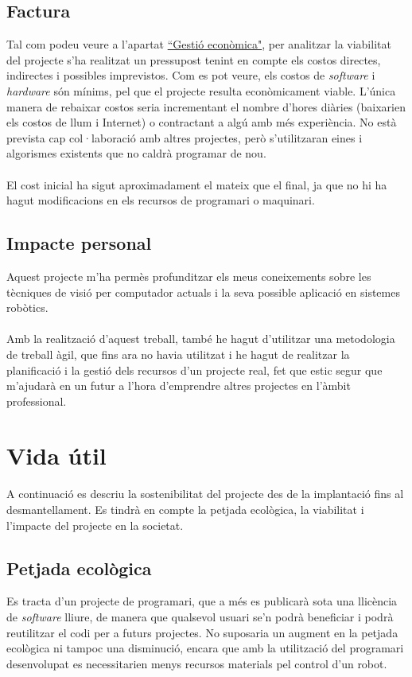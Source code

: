 	\subsection{Factura}
		Tal com podeu veure a l'apartat \hyperref[sec:Costos]{``Gestió econòmica"}, per analitzar la viabilitat del projecte s'ha realitzat un pressupost tenint en compte els costos directes, indirectes
		i possibles imprevistos. Com es pot veure, els costos de \textit{software} i \textit{hardware} són mínims, pel que el projecte resulta econòmicament viable.
		L'única manera de rebaixar costos seria incrementant el nombre d'hores diàries (baixarien els costos de llum i Internet) o contractant a algú amb més experiència.
		No està prevista cap col·laboració amb altres projectes, però s'utilitzaran eines i algorismes existents que no caldrà programar de nou.\\\\
		El cost inicial ha sigut aproximadament el mateix que el final, ja que no hi ha hagut modificacions en els recursos de programari o maquinari.

	\subsection{Impacte personal}
		Aquest projecte m'ha permès profunditzar els meus coneixements sobre les tècniques de visió per computador actuals i la seva possible aplicació en sistemes robòtics.\\\\
		Amb la realització d'aquest treball, també he hagut d'utilitzar una metodologia de treball àgil, que fins ara no havia utilitzat i he hagut de realitzar la planificació i la gestió dels recursos
		d'un projecte real, fet que estic segur que m'ajudarà en un futur a l'hora d'emprendre altres projectes en l'àmbit professional.

\section{Vida útil}
	A continuació es descriu la sostenibilitat del projecte des de la implantació fins al desmantellament. Es tindrà en compte la petjada ecològica, la viabilitat i l'impacte del projecte en la societat.
	\subsection{Petjada ecològica}
		Es tracta d'un projecte de programari, que a més es publicarà sota una llicència de \textit{software} lliure, de manera que qualsevol usuari se'n podrà beneficiar i podrà reutilitzar el
		codi per a futurs projectes. No suposaria un augment en la petjada ecològica ni tampoc una disminució, encara que amb la utilització del programari desenvolupat es necessitarien menys recursos materials
		pel control d'un robot.

